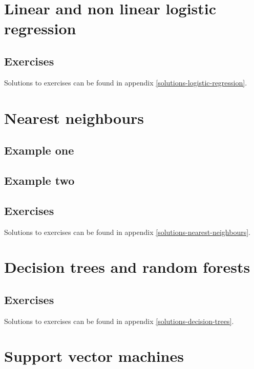 \documentclass[]{book}
\theoremstyle{definition}
\theoremstyle{definition}
\theoremstyle{definition}
\theoremstyle{remark}
\begin{document}
\chapter{Linear and non linear logistic
regression}\label{logistic-regression}

\section{Exercises}\label{exercises-1}

Solutions to exercises can be found in appendix
\ref{solutions-logistic-regression}.

\chapter{Nearest neighbours}\label{nearest-neighbours}

\section{Example one}\label{example-one}

\section{Example two}\label{example-two}

\section{Exercises}\label{exercises-2}

Solutions to exercises can be found in appendix
\ref{solutions-nearest-neighbours}.

\chapter{Decision trees and random forests}\label{decision-trees}

\section{Exercises}\label{exercises-3}

Solutions to exercises can be found in appendix
\ref{solutions-decision-trees}.

\chapter{Support vector machines}\label{svm}
\end{document}
